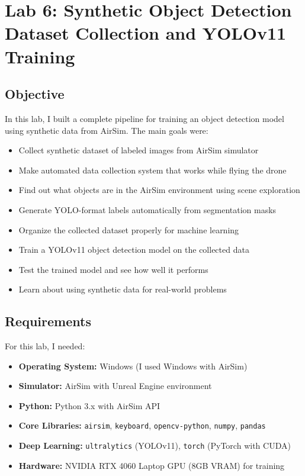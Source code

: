 \section{Lab 6: Synthetic Object Detection Dataset Collection and YOLOv11 Training}

\subsection{Objective}
In this lab, I built a complete pipeline for training an object detection model using synthetic data from AirSim. The main goals were:
\begin{itemize}
	\item Collect synthetic dataset of labeled images from AirSim simulator
	\item Make automated data collection system that works while flying the drone
	\item Find out what objects are in the AirSim environment using scene exploration
	\item Generate YOLO-format labels automatically from segmentation masks
	\item Organize the collected dataset properly for machine learning
	\item Train a YOLOv11 object detection model on the collected data
	\item Test the trained model and see how well it performs
	\item Learn about using synthetic data for real-world problems
\end{itemize}

\subsection{Requirements}
For this lab, I needed:
\begin{itemize}
	\item \textbf{Operating System:} Windows (I used Windows with AirSim)
	\item \textbf{Simulator:} AirSim with Unreal Engine environment
	\item \textbf{Python:} Python 3.x with AirSim API
	\item \textbf{Core Libraries:} \texttt{airsim}, \texttt{keyboard}, \texttt{opencv-python}, \texttt{numpy}, \texttt{pandas}
	\item \textbf{Deep Learning:} \texttt{ultralytics} (YOLOv11), \texttt{torch} (PyTorch with CUDA)
	\item \textbf{Hardware:} NVIDIA RTX 4060 Laptop GPU (8GB VRAM) for training
\end{itemize}

